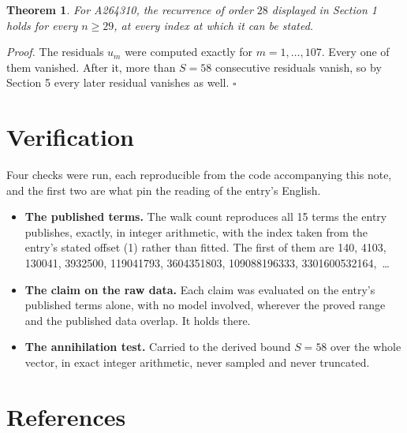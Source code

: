 \documentclass[11pt]{article}
\newtheorem{theorem}{Theorem}
\theoremstyle{definition}
\begin{document}
\begin{theorem} For A264310, the recurrence of order $28$ displayed in Section 1 holds for every $n \ge 29$, at every index at which it can be stated.\end{theorem}

{\itshape Proof.} The residuals $u_m$ were computed exactly for $m = 1,\dots,107$. Every one of them vanished. After it, more than $S = 58$ consecutive residuals vanish, so by Section 5 every later residual vanishes as well. $\square$

\section{Verification}

Four checks were run, each reproducible from the code accompanying this note, and the first two are what pin the reading of the entry's English.

\begin{itemize}

\item {\bfseries The published terms.} The walk count reproduces all 15 terms the entry publishes, exactly, in integer arithmetic, with the index taken from the entry's stated offset (1) rather than fitted. The first of them are 140, 4103, 130041, 3932500, 119041793, 3604351803, 109088196333, 3301600532164,~\dots

\item {\bfseries The claim on the raw data.} Each claim was evaluated on the entry's published terms alone, with no model involved, wherever the proved range and the published data overlap. It holds there.

\item {\bfseries The annihilation test.} Carried to the derived bound $S = 58$ over the whole vector, in exact integer arithmetic, never sampled and never truncated.

\end{itemize}

\section{References}
\end{document}
